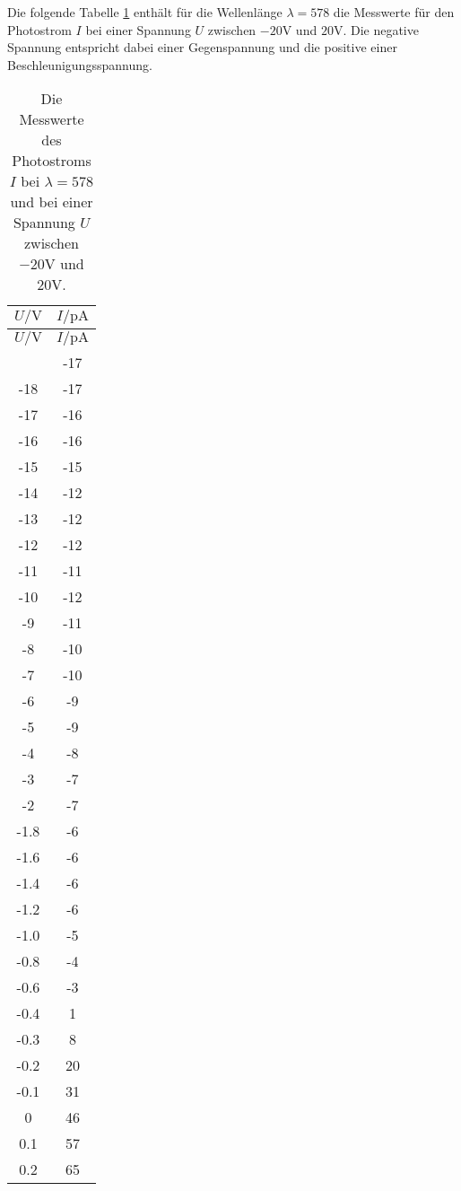 Die folgende Tabelle \ref{tab:speck} enthält für die Wellenlänge $\lambda=578$
die Messwerte für den Photostrom $I$ bei einer Spannung $U$ zwischen $-20\si{\volt}$ und
$20\si{\volt}$. Die negative Spannung entspricht dabei einer Gegenspannung und
die positive einer Beschleunigungsspannung.
\begin{center}
\begin{longtable}{c c}
  \caption{Die Messwerte des Photostroms $I$ bei $\lambda=578$ und bei einer Spannung $U$ zwischen $-20\si{\volt}$ und
  $20\si{\volt}$.}
  \label{tab:speck}\\
  \toprule
  $U/\si{\volt}$ & $I/\si{\pico\ampere}$      \\
  \midrule
  \endfirsthead
  \toprule
  $U/\si{\volt}$ & $I/\si{\pico\ampere}$      \\
  \midrule
  \endhead
  \bottomrule
  \endfoot
  -19  &  -17\\
  -18  &  -17\\
  -17  &  -16\\
  -16  &  -16\\
  -15  &  -15\\
  -14  &  -12\\
  -13  &  -12\\
  -12  &  -12\\
  -11  &  -11\\
  -10  & -12\\
  -9   & -11\\
  -8   & -10\\
  -7   & -10\\
  -6   & -9\\
  -5   & -9\\
  -4   & -8\\
  -3   & -7\\
  -2   & -7\\
  -1.8 & -6\\
  -1.6 &  -6\\
  -1.4 &  -6\\
  -1.2 &  -6\\
  -1.0 &  -5\\
  -0.8 &  -4\\
  -0.6 &  -3\\
  -0.4 &   1\\
  -0.3 &   8\\
  -0.2 &   20\\
  -0.1 &   31\\
  0    &   46\\
  0.1  &   57\\
  0.2  &   65\\

\end{longtable}
\end{center}

